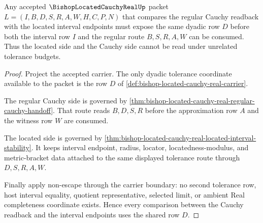 \begin{theorem}
\label{thm:bishop-located-cauchy-real-shared-tolerance-handoff}
Any accepted $\BishopLocatedCauchyRealUp$ packet $L=(I,B,D,S,R,A,W,H,C,P,N)$ that compares the regular Cauchy readback with the located interval endpoints must expose the same dyadic row $D$ before both the interval row $I$ and the regular route $B,S,R,A,W$ can be consumed. Thus the located side and the Cauchy side cannot be read under unrelated tolerance budgets.
\end{theorem}
\begin{proof}
Project the accepted carrier. The only dyadic tolerance coordinate available to the packet is the row $D$ of \autoref{def:bishop-located-cauchy-real-carrier}.

The regular Cauchy side is governed by \autoref{thm:bishop-located-cauchy-real-regular-cauchy-handoff}. That route reads $B,D,S,R$ before the approximation row $A$ and the witness row $W$ are consumed.

The located side is governed by \autoref{thm:bishop-located-cauchy-real-located-interval-stability}. It keeps interval endpoint, radius, locator, locatedness-modulus, and metric-bracket data attached to the same displayed tolerance route through $D,S,R,A,W$.

Finally apply non-escape through the carrier boundary: no second tolerance row, host interval equality, quotient representative, selected limit, or ambient Real completeness coordinate exists. Hence every comparison between the Cauchy readback and the interval endpoints uses the shared row $D$.
\end{proof}

